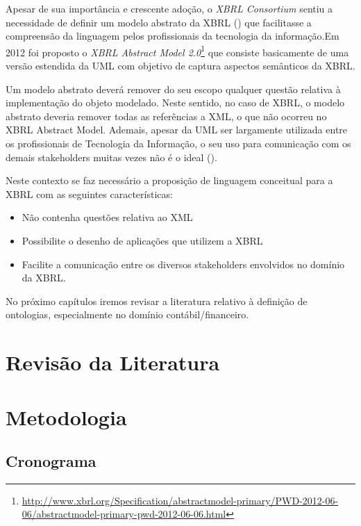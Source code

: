 \documentclass[msc,proposal]{ppgccufmg} %
\begin{document}
Apesar de sua importância e crescente adoção, o \textit{XBRL Consortium} sentiu a necessidade de definir um modelo abstrato da XBRL (\cite{xbrl_preserve_promote_particite}) que facilitasse a compreensão da linguagem pelos profissionais da tecnologia da informação.Em 2012 foi proposto o \textit{XBRL Abstract Model 2.0}\footnote{\url{http://www.xbrl.org/Specification/abstractmodel-primary/PWD-2012-06-06/abstractmodel-primary-pwd-2012-06-06.html}} que consiste basicamente de uma versão estendida da UML com objetivo de captura aspectos semânticos da XBRL. 

Um modelo abstrato deverá remover do seu escopo qualquer questão relativa à implementação do objeto modelado. Neste sentido, no caso de XBRL, o modelo abstrato deveria remover todas as referências a XML, o que não ocorreu no XBRL Abstract Model. Ademais, apesar da UML ser largamente utilizada entre os profissionais de Tecnologia da Informação, o seu uso para comunicação com os demais stakeholders muitas vezes não é o ideal (\cite{peixoto2008comparison}).

Neste contexto se faz necessário a proposição de linguagem conceitual para a XBRL com as seguintes características:
 \begin{itemize}
 	\item Não contenha questões relativa ao XML
 	\item Possibilite o desenho de aplicações que utilizem a XBRL
 	\item Facilite a comunicação entre os diversos stakeholders envolvidos no domínio da XBRL.
 \end{itemize}
 
No próximo capítulos iremos revisar a literatura relativo à definição de ontologias, especialmente no domínio contábil/financeiro.

\chapter{Revisão da Literatura}
\label{ch:revisao}

\chapter{Metodologia}
\label{ch:metodologia}

\begin{attachments}
\chapter{Cronograma}
\label{attch:cronograma}
\end{attachments}
\end{document}
